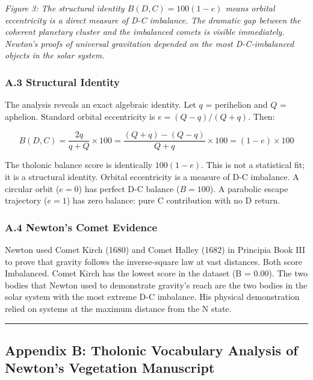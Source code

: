 \documentclass[
  11pt,
  letterpaper,
]{article}
\begin{document}
\emph{Figure 3: The structural identity \(B(D,C) = 100(1-e)\) means
orbital eccentricity is a direct measure of D-C imbalance. The dramatic
gap between the coherent planetary cluster and the imbalanced comets is
visible immediately. Newton's proofs of universal gravitation depended
on the most D-C-imbalanced objects in the solar system.}

\subsubsection{A.3 Structural Identity}\label{a.3-structural-identity}

The analysis reveals an exact algebraic identity. Let \(q\) = perihelion
and \(Q\) = aphelion. Standard orbital eccentricity is
\(e = (Q-q)/(Q+q)\). Then:

\[B(D,C) = \frac{2q}{q+Q} \times 100 = \frac{(Q+q)-(Q-q)}{Q+q} \times 100 = (1-e) \times 100\]

The tholonic balance score is identically \(100(1-e)\). This is not a
statistical fit; it is a structural identity. Orbital eccentricity is a
measure of D-C imbalance. A circular orbit (\(e = 0\)) has perfect D-C
balance (\(B = 100\)). A parabolic escape trajectory (\(e = 1\)) has
zero balance: pure C contribution with no D return.

\subsubsection{A.4 Newton's Comet
Evidence}\label{a.4-newtons-comet-evidence}

Newton used Comet Kirch (1680) and Comet Halley (1682) in Principia Book
III to prove that gravity follows the inverse-square law at vast
distances. Both score Imbalanced. Comet Kirch has the lowest score in
the dataset (B = 0.00). The two bodies that Newton used to demonstrate
gravity's reach are the two bodies in the solar system with the most
extreme D-C imbalance. His physical demonstration relied on systems at
the maximum distance from the N state.

\begin{center}\rule{0.5\linewidth}{0.5pt}\end{center}

\subsection{Appendix B: Tholonic Vocabulary Analysis of Newton's
Vegetation
Manuscript}\label{appendix-b-tholonic-vocabulary-analysis-of-newtons-vegetation-manuscript}
\end{document}
